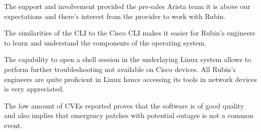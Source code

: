 The support and involvement provided the pre-sales Arista team it is above our expectations and there's interest from the provider to work with Rubin. 

The similarities of the CLI to the Cisco CLI makes it easier for Rubin's engineers to learn and understand the components of the operating system. 

The capability to open a shell session in the underlaying Linux system allows to perform further troubleshooting not available on Cisco devices. All Rubin's engineers are quite proficient in Linux hence accessing its tools in network devices is very appreciated. 

The low amount of CVEs reported proves that the software is of good quality and also implies that emergency patches with potential outages is not a common event. 